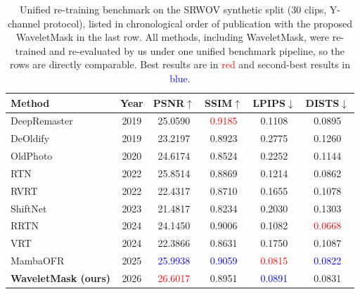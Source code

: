 \begin{table}[H]
\caption{Unified re-training benchmark on the SRWOV synthetic split (30 clips, Y-channel protocol), listed in chronological order of publication with the proposed WaveletMask in the last row. All methods, including WaveletMask, were re-trained and re-evaluated by us under one unified benchmark pipeline, so the rows are directly comparable. Best results are in \textcolor{red}{red} and second-best results in \textcolor{blue}{blue}.\label{tab:literature_context}}
\footnotesize
\begin{tabularx}{\textwidth}{lcCCCC}
\toprule
\textbf{Method} & \textbf{Year} & \textbf{PSNR$\uparrow$} & \textbf{SSIM$\uparrow$} & \textbf{LPIPS$\downarrow$} & \textbf{DISTS$\downarrow$} \\
\midrule
DeepRemaster~\cite{iizuka2019deepremaster}  & 2019 & 25.0590 & \textcolor{red}{0.9185} & 0.1108 & 0.0895 \\
DeOldify~\cite{jantic2019deoldify}          & 2019 & 23.2197 & 0.8923 & 0.2775 & 0.1260 \\
OldPhoto~\cite{wan2020bringing}             & 2020 & 24.6174 & 0.8524 & 0.2252 & 0.1144 \\
RTN~\cite{rtn2022}                          & 2022 & 25.8514 & 0.8869 & 0.1214 & 0.0862 \\
RVRT~\cite{liang2022rvrt}                   & 2022 & 22.4317 & 0.8710 & 0.1655 & 0.1078 \\
ShiftNet~\cite{li2023shiftnet}              & 2023 & 21.4817 & 0.8234 & 0.2030 & 0.1303 \\
RRTN~\cite{rrtn2024}                        & 2024 & 24.1450 & 0.9006 & 0.1082 & \textcolor{red}{0.0668} \\
VRT~\cite{liang2024vrt}                     & 2024 & 22.3866 & 0.8631 & 0.1750 & 0.1087 \\
MambaOFR~\cite{mao2025mambaofr}             & 2025 & \textcolor{blue}{25.9938} & \textcolor{blue}{0.9059} & \textcolor{red}{0.0815} & \textcolor{blue}{0.0822} \\
\midrule
\textbf{WaveletMask (ours)}                 & 2026 & \textcolor{red}{26.6017} & 0.8951 & \textcolor{blue}{0.0891} & 0.0831 \\
\bottomrule
\end{tabularx}
\normalsize
\end{table}

